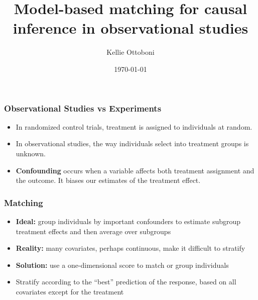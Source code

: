 \documentclass{beamer}
\title[Model-based matching]{Model-based matching for causal inference in observational studies}
\author{Kellie Ottoboni}
\institute[]{Department of Statistics, UC Berkeley}
\date{\today}
\begin{document}
\frame{\titlepage}

\frame
{
  \frametitle{Observational Studies vs Experiments}
 \begin{center}
\begin{itemize}
\item In randomized control trials, treatment is assigned to individuals at random.
\item In observational studies, the way individuals select into treatment groups is unknown.
\item \textbf{Confounding} occurs when a variable affects both treatment assignment and the outcome. It biases our estimates of the treatment effect.
\end{itemize}
\end{center}
}


\frame
{
  \frametitle{Matching}
\begin{center}
\begin{itemize}
\item \textbf{Ideal:} group individuals by important confounders to estimate subgroup treatment effects and then average over subgroups
\item \textbf{Reality:} many covariates, perhaps continuous, make it difficult to stratify
\item \textbf{Solution:} use a one-dimensional score to match or group individuals
\item  Stratify according to the ``best'' prediction of the response, based on all covariates except for the treatment
\end{itemize}
\end{center}
}
\end{document}
